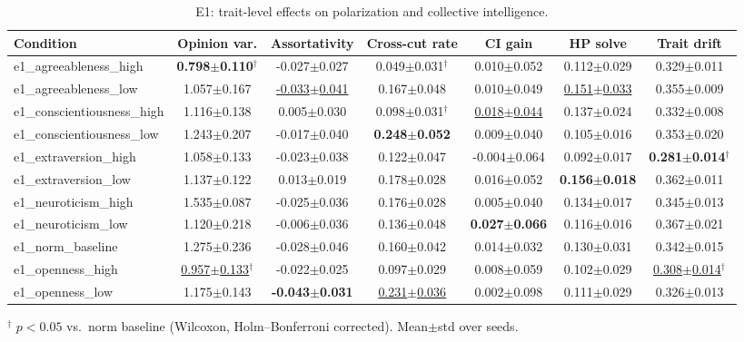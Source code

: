 \begin{table}[t]\centering
\caption{E1: trait-level effects on polarization and collective intelligence.}
\label{tab:e1}
\small
\begin{tabular}{lcccccc}
\toprule
Condition & Opinion var. & Assortativity & Cross-cut rate & CI gain & HP solve & Trait drift \\
\midrule
e1\_agreeableness\_high & \textbf{0.798{\small$\pm$0.110}}$^{\dagger}$ & -0.027{\small$\pm$0.027} & 0.049{\small$\pm$0.031}$^{\dagger}$ & 0.010{\small$\pm$0.052} & 0.112{\small$\pm$0.029} & 0.329{\small$\pm$0.011} \\
e1\_agreeableness\_low & 1.057{\small$\pm$0.167} & \underline{-0.033{\small$\pm$0.041}} & 0.167{\small$\pm$0.048} & 0.010{\small$\pm$0.049} & \underline{0.151{\small$\pm$0.033}} & 0.355{\small$\pm$0.009} \\
e1\_conscientiousness\_high & 1.116{\small$\pm$0.138} & 0.005{\small$\pm$0.030} & 0.098{\small$\pm$0.031}$^{\dagger}$ & \underline{0.018{\small$\pm$0.044}} & 0.137{\small$\pm$0.024} & 0.332{\small$\pm$0.008} \\
e1\_conscientiousness\_low & 1.243{\small$\pm$0.207} & -0.017{\small$\pm$0.040} & \textbf{0.248{\small$\pm$0.052}} & 0.009{\small$\pm$0.040} & 0.105{\small$\pm$0.016} & 0.353{\small$\pm$0.020} \\
e1\_extraversion\_high & 1.058{\small$\pm$0.133} & -0.023{\small$\pm$0.038} & 0.122{\small$\pm$0.047} & -0.004{\small$\pm$0.064} & 0.092{\small$\pm$0.017} & \textbf{0.281{\small$\pm$0.014}}$^{\dagger}$ \\
e1\_extraversion\_low & 1.137{\small$\pm$0.122} & 0.013{\small$\pm$0.019} & 0.178{\small$\pm$0.028} & 0.016{\small$\pm$0.052} & \textbf{0.156{\small$\pm$0.018}} & 0.362{\small$\pm$0.011} \\
e1\_neuroticism\_high & 1.535{\small$\pm$0.087} & -0.025{\small$\pm$0.036} & 0.176{\small$\pm$0.028} & 0.005{\small$\pm$0.040} & 0.134{\small$\pm$0.017} & 0.345{\small$\pm$0.013} \\
e1\_neuroticism\_low & 1.120{\small$\pm$0.218} & -0.006{\small$\pm$0.036} & 0.136{\small$\pm$0.048} & \textbf{0.027{\small$\pm$0.066}} & 0.116{\small$\pm$0.016} & 0.367{\small$\pm$0.021} \\
e1\_norm\_baseline & 1.275{\small$\pm$0.236} & -0.028{\small$\pm$0.046} & 0.160{\small$\pm$0.042} & 0.014{\small$\pm$0.032} & 0.130{\small$\pm$0.031} & 0.342{\small$\pm$0.015} \\
e1\_openness\_high & \underline{0.957{\small$\pm$0.133}}$^{\dagger}$ & -0.022{\small$\pm$0.025} & 0.097{\small$\pm$0.029} & 0.008{\small$\pm$0.059} & 0.102{\small$\pm$0.029} & \underline{0.308{\small$\pm$0.014}}$^{\dagger}$ \\
e1\_openness\_low & 1.175{\small$\pm$0.143} & \textbf{-0.043{\small$\pm$0.031}} & \underline{0.231{\small$\pm$0.036}} & 0.002{\small$\pm$0.098} & 0.111{\small$\pm$0.029} & 0.326{\small$\pm$0.013} \\
\bottomrule
\end{tabular}
\par\smallskip\footnotesize $^{\dagger}$ $p<0.05$ vs.\ norm baseline (Wilcoxon, Holm--Bonferroni corrected). Mean$\pm$std over seeds.
\end{table}